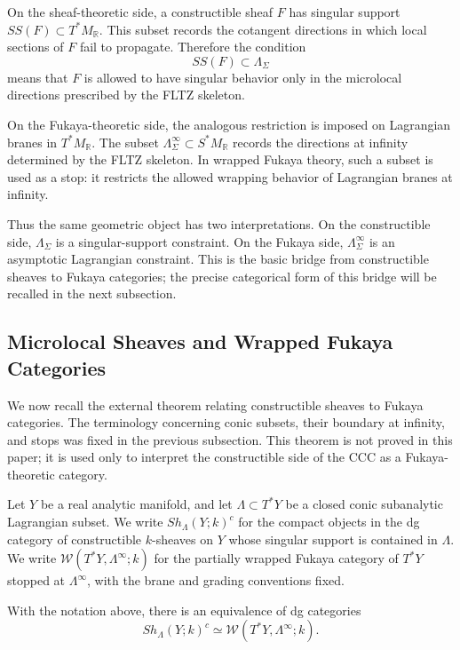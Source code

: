 On the sheaf-theoretic side, a constructible sheaf \(F\) has singular
support \(SS(F)\subset T^*M_{\mathbb R}\). This subset records the cotangent
directions in which local sections of \(F\) fail to propagate. Therefore the
condition
\[
SS(F)\subset \Lambda_\Sigma
\]
means that \(F\) is allowed to have singular behavior only in the
microlocal directions prescribed by the FLTZ skeleton.

On the Fukaya-theoretic side, the analogous restriction is imposed on
Lagrangian branes in \(T^*M_{\mathbb R}\). The subset
\(\Lambda_\Sigma^\infty\subset S^*M_{\mathbb R}\) records the directions at
infinity determined by the FLTZ skeleton. In wrapped Fukaya theory, such a
subset is used as a stop: it restricts the allowed wrapping behavior of
Lagrangian branes at infinity.

Thus the same geometric object has two interpretations. On the
constructible side, \(\Lambda_\Sigma\) is a singular-support constraint. On
the Fukaya side, \(\Lambda_\Sigma^\infty\) is an asymptotic Lagrangian
constraint. This is the basic bridge from constructible sheaves to Fukaya
categories; the precise categorical form of this bridge will be recalled in
the next subsection.

\subsection{Microlocal Sheaves and Wrapped Fukaya Categories}

We now recall the external theorem relating constructible sheaves to Fukaya
categories. The terminology concerning conic subsets, their boundary at
infinity, and stops was fixed in the previous subsection. This theorem is
not proved in this paper; it is used only to interpret the constructible side
of the CCC as a Fukaya-theoretic category.

Let \(Y\) be a real analytic manifold, and let
\(\Lambda\subset T^*Y\) be a closed conic subanalytic Lagrangian subset.
We write \(Sh_\Lambda(Y;k)^c\) for the compact objects in the dg category of
constructible \(k\)-sheaves on \(Y\) whose singular support is contained in
\(\Lambda\). We write
\(\mathcal W(T^*Y,\Lambda^\infty;k)\) for the partially wrapped Fukaya
category of \(T^*Y\) stopped at \(\Lambda^\infty\), with the brane and
grading conventions fixed.

\begin{theorem}\label{thm:microlocal-fukaya}
With the notation above, there is an equivalence of dg categories
\[
Sh_\Lambda(Y;k)^c
\simeq
\mathcal W(T^*Y,\Lambda^\infty;k).
\]
\end{theorem}


